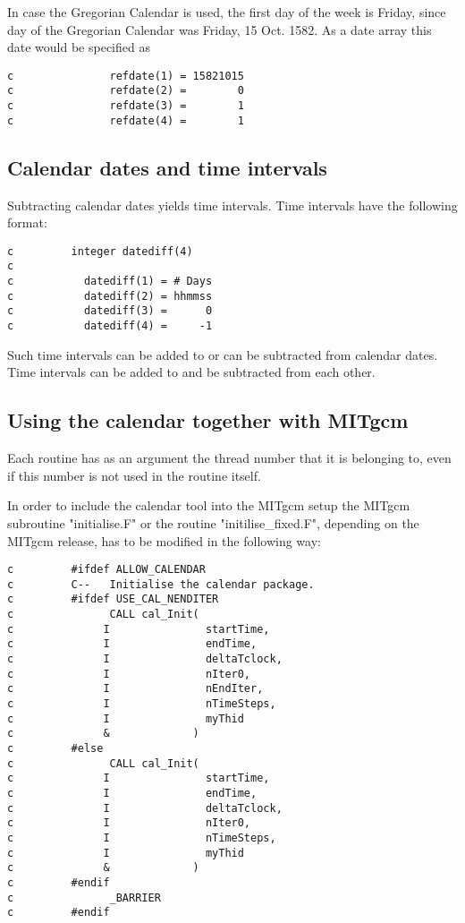           In case the Gregorian Calendar is used, the first
          day of the week is Friday, since day of the Gregorian
          Calendar was Friday, 15 Oct. 1582. As a date array
          this date would be specified as

\begin{verbatim}
c               refdate(1) = 15821015
c               refdate(2) =        0
c               refdate(3) =        1
c               refdate(4) =        1
\end{verbatim}

\subsection{Calendar dates and time intervals}

    Subtracting calendar dates yields time intervals.
    Time intervals have the following format:

\begin{verbatim}
c         integer datediff(4)
c
c           datediff(1) = # Days
c           datediff(2) = hhmmss
c           datediff(3) =      0
c           datediff(4) =     -1
\end{verbatim}

    Such time intervals can be added to or can be subtracted from
    calendar dates. Time intervals can be added to and be
    subtracted from each other.

\subsection{Using the calendar together with MITgcm}

    Each routine has as an argument the thread number that it is
    belonging to, even if this number is not used in the routine
    itself.

    In order to include the calendar tool into the MITgcm
    setup the MITgcm subroutine "initialise.F" or the routine
    "initilise\_fixed.F", depending on the MITgcm release, has
    to be modified in the following way:

{\footnotesize
\begin{verbatim}
c         #ifdef ALLOW_CALENDAR
c         C--   Initialise the calendar package.
c         #ifdef USE_CAL_NENDITER
c               CALL cal_Init(
c              I               startTime,
c              I               endTime,
c              I               deltaTclock,
c              I               nIter0,
c              I               nEndIter,
c              I               nTimeSteps,
c              I               myThid
c              &             )
c         #else
c               CALL cal_Init(
c              I               startTime,
c              I               endTime,
c              I               deltaTclock,
c              I               nIter0,
c              I               nTimeSteps,
c              I               myThid
c              &             )
c         #endif
c               _BARRIER
c         #endif
\end{verbatim}
}

